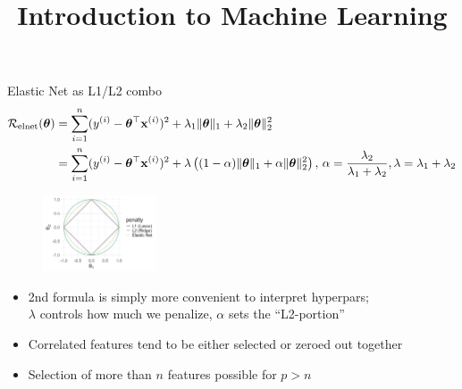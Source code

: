 \documentclass[11pt,compress,t,notes=noshow, xcolor=table]{beamer}
\title{Introduction to Machine Learning}
\begin{document}

\begin{vbframe}{Elastic Net as L1/L2 combo }
\vspace{-0.7cm}
\small{
\begin{align*}
\mathcal{R}_{\text{elnet}}(\bm{\theta}) &=  \sum\limits_{i=1}^n (y^{(i)} - \bm{\theta}^\top \mathbf{x}^{(i)})^2 + \lambda_1 \|\bm{\theta}\|_1 + \lambda_2 \|\bm{\theta}\|_2^2 \\
&= \sum\limits_{i=1}^n (y^{(i)} - \bm{\theta}^\top \mathbf{x}^{(i)})^2 + \lambda \left( (1-\alpha) \|\bm{\theta}\|_1 + \alpha \|\bm{\theta}\|_2^2\right),\, \alpha=\frac{\lambda_2}{\lambda_1+\lambda_2}, \lambda=\lambda_1+\lambda_2
\end{align*}}
\begin{figure}
\vspace{-0.3cm}
\includegraphics[width=0.3\textwidth]{figure/lasso_ridge_enet_2d.png}\\
\end{figure}
\vspace{-0.3cm}
\begin{itemize}
\item 2nd formula is simply more convenient to interpret hyperpars;\\
    $\lambda$ controls how much we penalize, $\alpha$ sets the ``L2-portion''
\item Correlated features tend to be either selected or zeroed out together
\item Selection of more than $n$ features possible for $p>n$
\end{itemize}
\end{vbframe}
\end{document}
